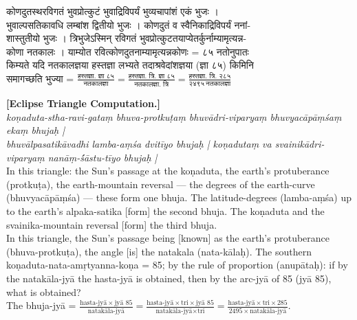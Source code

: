 \documentclass[11pt,a4paper]{article}
\newcommand{\dev}[1]{{\devanagarifont #1}}
\newcommand{\bilingualpair}[2]{%
  \noindent%
  \begin{minipage}[t]{0.48\textwidth}
    #1%
  \end{minipage}%
  \hfill%
  \begin{minipage}[t]{0.48\textwidth}
    #2%
  \end{minipage}%
  \par\vspace{0.5em}%
}
\newenvironment{sanskritcol}{\devanagarifont\small}{}
\newenvironment{englishcol}{\iastfont\small}{}
\begin{document}
\vspace{0.5cm}
\bilingualpair{%
\begin{sanskritcol}
\dev{कोणदुतस्थरविगतं भुवप्रोत्कुटं भुवाद्रिविपर्यं भुव्यचापांशं एकं भुजः ।}\\[0.3em]
\dev{भुवाल्पसतिकावधि लम्बांश द्वितीयो भुजः । कोणदुतं व स्वैनिकाद्रिविपर्यं ननां-}\\[0.3em]
\dev{शास्तुतीयो भुजः । त्रिभुजेऽस्मिन् रविगतं भुवप्रोत्कुटतयाप्येतर्कुर्नाम्यामृत्यन्न-}\\[0.3em]
\dev{कोणा नतकालः । याम्योत रवित्कोणदुतनाम्यामृत्यन्नकोणः = ८५ नतोनुपातः}\\[0.3em]
\dev{किम्यते यदि नतकालज्ञया हस्तज्ञा लभ्यते तदाश्रवेदांशज्ञया (ज्ञा ८५) किमिनि}\\[0.3em]
\dev{समागच्छति भुज्या = $\frac{\text{हस्तज्ञा. ज्ञा ८५}}{\text{नतकालज्ञा}} = \frac{\text{हस्तज्ञा. त्रि. ज्ञा ८५}}{\text{नतकालज्ञा. त्रि}} = \frac{\text{हस्तज्ञा. त्रि. २८५}}{२४९५\ \text{नतकालज्ञा}}$}
\end{sanskritcol}%
}{%
\begin{englishcol}
\textbf{[Eclipse Triangle Computation.]}\\[0.3em]
\textit{koṇaduta-stha-ravi-gataṃ bhuva-protkuṭaṃ bhuvādri-viparyaṃ bhuvyacāpāṃśaṃ ekaṃ bhujaḥ |}\\[0.3em]
\textit{bhuvālpasatikāvadhi lamba-aṃśa dvitīyo bhujaḥ | koṇadutaṃ va svainikādri-viparyaṃ nanāṃ-\'śāstu-tīyo bhujaḥ |}\\[0.3em]
In this triangle: the Sun's passage at the koṇaduta, the earth's protuberance (protkuṭa), the earth-\-mountain reversal --- the degrees of the earth-\-curve (bhuvyacāpāṃśa) --- these form one bhuja. The latitude-\-degrees (lamba-aṃśa) up to the earth's alpaka-\-satika [form] the second bhuja. The koṇaduta and the svainika-\-mountain reversal [form] the third bhuja.\\[0.3em]
In this triangle, the Sun's passage being [known] as the earth's protuberance (bhuva-protkuṭa), the angle [is] the natakala (nata-kālaḥ). The southern koṇaduta-nata-amṛtyanna-koṇa = 85; by the rule of proportion (anupātaḥ): if by the natakāla-jyā the hasta-jyā is obtained, then by the arc-jyā of 85 (jyā 85), what is obtained?\\[0.3em]
The bhuja-jyā = $\frac{\text{hasta-jyā} \times \text{jyā } 85}{\text{natakāla-jyā}} = \frac{\text{hasta-jyā} \times \text{tri} \times \text{jyā } 85}{\text{natakāla-jyā} \times \text{tri}} = \frac{\text{hasta-jyā} \times \text{tri} \times 285}{2495 \times \text{natakāla-jyā}}$.
\end{englishcol}%
}
\end{document}
